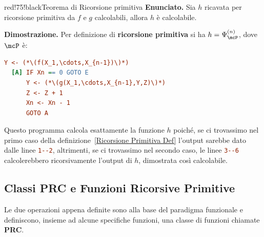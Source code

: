 
\newpage

\begin{halfframedbox}{red!75!black}{Teorema di Ricorsione primitiva}\label{Ricorsione Primitiva Teorema}
  \textbf{Enunciato.} Sia \(h\) ricavata per ricorsione primitiva da \(f\) e \(g\) calcolabili, allora \(h\) è calcolabile.

  \begin{center}
    \textcolor{red!75!black}{\hdashrule[0.5ex]{18cm}{1pt}{3mm 3pt 1mm 2pt}}
  \end{center}

  \textbf{Dimostrazione.} Per definizione di \textbf{ricorsione primitiva} si ha \(h=\Psi_{\mcP}^{(n)}\), dove \(\mcP\) è:
  \begin{lstlisting}[language=ini, autogobble=false, label={Teorema ricorsione primitiva},  caption=Dimostrazione Teorema di Ricorsione Primitiva]
      Y <- (*\(f(X_1,\cdots,X_{n-1})\)*)
  [A] IF Xn == 0 GOTO E
      Y <- (*\(g(X_1,\cdots,X_{n-1},Y,Z)\)*)
      Z <- Z + 1
      Xn <- Xn - 1
      GOTO A
  \end{lstlisting}
\end{halfframedbox}

Questo programma calcola esattamente la funzione \(h\) poiché, se ci trovassimo nel primo caso della definizione~\ref{Ricorsione Primitiva Def} l'output sarebbe dato dalle linee \lstinline[language=ini]{1--2}, altrimenti, se ci trovassimo nel secondo caso, le linee \lstinline[language=ini]{3--6} calcolerebbero ricorsivamente l'output di \(h\), dimostrata così calcolabile.

\subsection{Classi PRC e Funzioni Ricorsive Primitive}

Le due operazioni appena definite sono alla base del paradigma funzionale e definiscono, insieme ad alcune specifiche funzioni, una classe di funzioni chiamate \textbf{PRC}.

